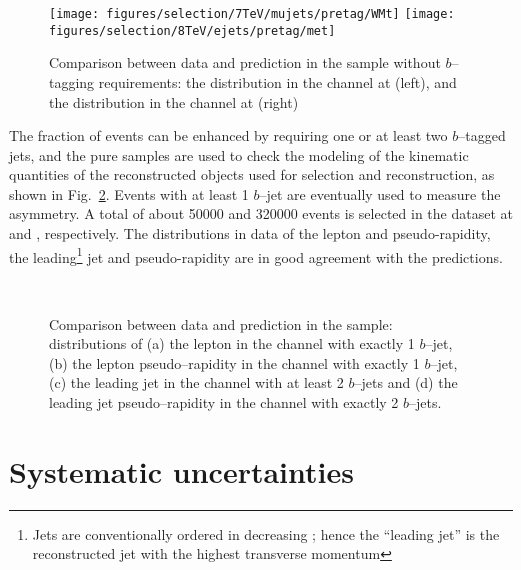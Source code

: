 \begin{figure}\centering
  \texttt{[image: figures/selection/7TeV/mujets/pretag/WMt]}
  \texttt{[image: figures/selection/8TeV/ejets/pretag/met]}
  \caption{
    Comparison between data and prediction in the sample without
    $b$--tagging requirements: the \mtw{} distribution in the
    \mujets{} channel at \seventev{} (left), and the \met{} distribution in
    the \ejets{} channel at \eighttev{} (right)}
  \label{fig:pretagdatamc}
\end{figure}

The fraction of \ttbar{} events can be enhanced by requiring one or
at least two $b$--tagged jets, and the pure samples are used to check the
modeling of the kinematic quantities of the reconstructed
objects used for selection and reconstruction, as shown in
Fig.~\ref{fig:taggeddatamc}. Events with at least 1 $b$--jet are
eventually used to measure the asymmetry. A total of about 50000 and
320000 \ttbar{} events is selected in the dataset at \seventev{} and
\eighttev{}, respectively.
The distributions in data of the lepton \pt{} and pseudo-rapidity, the
leading\footnote{Jets are conventionally ordered in decreasing \pt{};
  hence the ``leading jet'' is the reconstructed jet with the highest
  transverse momentum} jet \pt{} and pseudo-rapidity are in good
agreement with the predictions.

\begin{figure}\centering
  \quad
  \\
  \quad
  \caption{
    Comparison between data and prediction in the \eighttev{} sample:
    distributions of (a) the lepton \pt{} in the \mujets{} channel with
    exactly 1 $b$--jet, (b) the lepton pseudo--rapidity in the \ejets{}
    channel with exactly 1 $b$--jet, (c) the leading jet \pt{} in the
    \mujets{} channel with at least 2 $b$--jets and (d) the leading
    jet pseudo--rapidity in the \ejets{} channel with exactly 2
    $b$--jets.
}
  \label{fig:taggeddatamc}
\end{figure}

\section{Systematic uncertainties}

